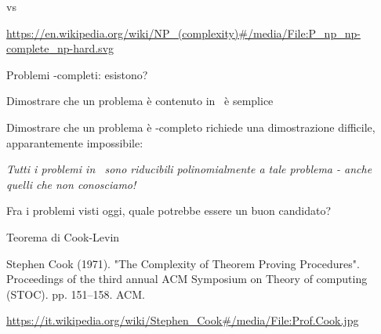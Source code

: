 \begin{frame}{\PTIME vs \NP}

\vspace{-6pt}

\tiny
\url{https://en.wikipedia.org/wiki/NP\_(complexity)\#/media/File:P\_np\_np-complete\_np-hard.svg}

\end{frame}

\begin{frame}{Problemi \NP-completi: esistono?}

\BIL
\item Dimostrare che un problema è contenuto in \NP\ è semplice
\item Dimostrare che un problema è \NP-completo richiede una dimostrazione difficile, apparantemente impossibile:

\bigskip
\emph{Tutti i problemi in \NP\ sono riducibili polinomialmente a tale problema - anche quelli che non conosciamo!}
\EIL

\bigskip
Fra i problemi visti oggi, quale potrebbe essere un buon candidato?

\end{frame}

\begin{frame}{Teorema di Cook-Levin}

\vspace{-9pt}
\begin{block}{}
Stephen Cook (1971). "The Complexity of Theorem Proving Procedures". Proceedings of the third annual ACM Symposium on Theory of computing (STOC). pp. 151–158. ACM.
\end{block}


\bigskip
\tiny
\url{https://it.wikipedia.org/wiki/Stephen\_Cook\#/media/File:Prof.Cook.jpg}

\end{frame}

